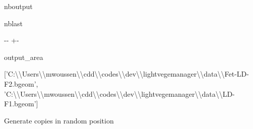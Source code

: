 \documentclass[letterpaper,10pt,english]{sphinxmanual}
\begin{document}
\begin{sphinxuseclass}{nboutput}
\begin{sphinxuseclass}{nblast}
{

\kern-\sphinxverbatimsmallskipamount\kern-\baselineskip
\kern+\FrameHeightAdjust\kern-\fboxrule
\vspace{\nbsphinxcodecellspacing}

\begin{sphinxuseclass}{output_area}
\begin{sphinxuseclass}{}


\begin{sphinxVerbatim}[commandchars=\\\{\}]
\llap{\color{nbsphinxout}[2]:\,\hspace{\fboxrule}\hspace{\fboxsep}}['C:\textbackslash{}\textbackslash{}Users\textbackslash{}\textbackslash{}mwoussen\textbackslash{}\textbackslash{}cdd\textbackslash{}\textbackslash{}codes\textbackslash{}\textbackslash{}dev\textbackslash{}\textbackslash{}lightvegemanager\textbackslash{}\textbackslash{}data\textbackslash{}\textbackslash{}Fet-LD-F2.bgeom',
 'C:\textbackslash{}\textbackslash{}Users\textbackslash{}\textbackslash{}mwoussen\textbackslash{}\textbackslash{}cdd\textbackslash{}\textbackslash{}codes\textbackslash{}\textbackslash{}dev\textbackslash{}\textbackslash{}lightvegemanager\textbackslash{}\textbackslash{}data\textbackslash{}\textbackslash{}LD-F1.bgeom']
\end{sphinxVerbatim}



\end{sphinxuseclass}
\end{sphinxuseclass}
}

\end{sphinxuseclass}
\end{sphinxuseclass}
\sphinxAtStartPar
Generate copies in random position
\end{document}
